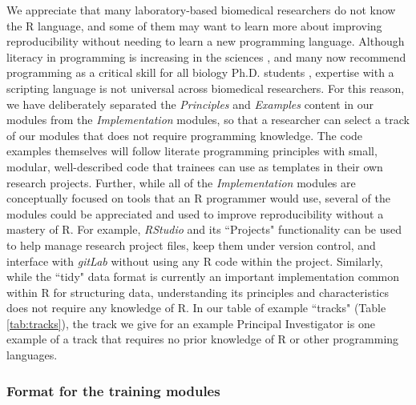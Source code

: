 \documentclass[pdftex,english,11.5pt,parskip=half]{scrartcl}
\begin{document}
We appreciate that many laboratory-based biomedical researchers do not know the R language, and
some of them may want to learn more about improving reproducibility without
needing to learn a new programming language. 
Although literacy in programming is increasing in the sciences
\cite{ram2013git}, and many now recommend programming as a critical skill for
all biology Ph.D. students \cite{list2017ten}, expertise
with a scripting language is not universal across biomedical researchers. For this reason, we have
deliberately separated the \textit{Principles} and \textit{Examples} content in our modules
from the \textit{Implementation} modules, so that a researcher can select a track of
our modules that does not require programming knowledge. The code examples themselves will follow literate programming principles with small, modular, well-described code that trainees can use as templates in their own research projects. Further, while all of
the \textit{Implementation} modules are conceptually focused on tools that an R
programmer would use, several of the modules could be appreciated and used to
improve reproducibility without a mastery of R. For example, \textit{RStudio} and its
``Projects" functionality can be used to help manage research project files,
keep them under version control, and interface with \textit{gitLab} without using any R code within the project. Similarly, while
the ``tidy" data format is currently an important implementation common within R
for structuring data, understanding its principles and characteristics does not
require any knowledge of R. In our table of example ``tracks" (Table \ref*{tab:tracks}), the track we give for an example Principal Investigator is one example
of a track that requires no prior knowledge of R or other programming
languages.   







\subsubsection*{Format for the training modules}
\end{document}
